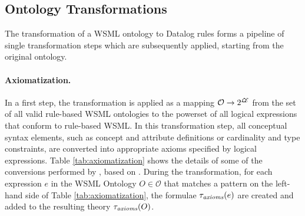 \def\mvexpr{\ensuremath{E}}
\def\mvex{\ensuremath{E_x}}
\def\mvey{\ensuremath{E_y}}
\def\mvez{\ensuremath{E_z}}
\def\mve1{\ensuremath{E_1}}
\def\mven{\ensuremath{E_n}}

\subsection{Ontology Transformations}
The transformation of a WSML ontology to Datalog rules forms a
pipeline of single transformation steps which are subsequently
applied, starting from the original ontology.

\paragraph{Axiomatization.} In a first step, the transformation
\transax is applied as a mapping $\mathcal{O} \rightarrow 2^{\mathcal{L\!E}}$
from the set of all valid rule-based WSML ontologies to the
powerset of all logical expressions that conform to rule-based
WSML. In this transformation step, all conceptual syntax elements,
such as concept and attribute definitions or cardinality and type
constraints, are converted into appropriate axioms specified by
logical expressions. Table \ref{tab:axiomatization} shows the
details of some of the conversions performed by \transax, based on
\cite{wsml-spec}. During the transformation, for each expression
$e$ in the WSML Ontology $O \in \mathcal{O}$ that matches a
pattern on the left-hand side of Table \ref{tab:axiomatization},
the formulae $\tau_{\textit{\scriptsize{axioms}}}(e)$ are created and added to the resulting
theory $\tau_{\textit{\scriptsize{axioms}}}(O)$.

